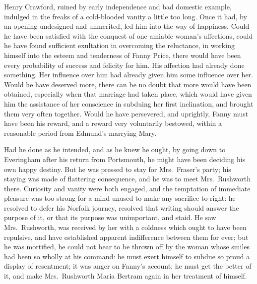 Henry Crawford, ruined by early independence and bad
domestic example, indulged in the freaks of a cold-blooded
vanity a little too long.  Once it had, by an opening
undesigned and unmerited, led him into the way of happiness.
Could he have been satisfied with the conquest of one
amiable woman's affections, could he have found sufficient
exultation in overcoming the reluctance, in working himself
into the esteem and tenderness of Fanny Price, there would
have been every probability of success and felicity for him.
His affection had already done something.  Her influence
over him had already given him some influence over her.
Would he have deserved more, there can be no doubt
that more would have been obtained, especially when
that marriage had taken place, which would have given
him the assistance of her conscience in subduing her
first inclination, and brought them very often together.
Would he have persevered, and uprightly, Fanny must have
been his reward, and a reward very voluntarily bestowed,
within a reasonable period from Edmund's marrying Mary.

Had he done as he intended, and as he knew he ought,
by going down to Everingham after his return from Portsmouth,
he might have been deciding his own happy destiny.
But he was pressed to stay for Mrs.\ Fraser's party;
his staying was made of flattering consequence, and he
was to meet Mrs.\ Rushworth there.  Curiosity and vanity
were both engaged, and the temptation of immediate pleasure
was too strong for a mind unused to make any sacrifice
to right:  he resolved to defer his Norfolk journey,
resolved that writing should answer the purpose of it,
or that its purpose was unimportant, and staid.  He saw
Mrs.\ Rushworth, was received by her with a coldness which
ought to have been repulsive, and have established apparent
indifference between them for ever; but he was mortified,
he could not bear to be thrown off by the woman whose
smiles had been so wholly at his command:  he must exert
himself to subdue so proud a display of resentment; it was
anger on Fanny's account; he must get the better of it,
and make Mrs.\ Rushworth Maria Bertram again in her treatment
of himself.

